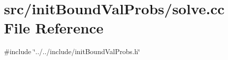 \section{src/init\+Bound\+Val\+Probs/solve.cc File Reference}
\label{solve_8cc}
{\ttfamily \#include \char`\"{}../../include/init\+Bound\+Val\+Probs.\+h\char`\"{}}\newline
